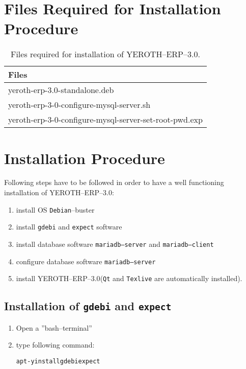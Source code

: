\documentclass[a4paper, 10pt]{article}
\newcommand{\texlive}{\texttt{Texlive}\xspace}
\newcommand{\gdebi}{\texttt{gdebi}\xspace}
\newcommand{\expect}{\texttt{expect}\xspace}
\newcommand{\debian}{\texttt{Debian}\xspace}
\newcommand{\qt}{\texttt{Qt}\xspace}
\newcommand{\mariadbserver}{\texttt{mariadb--server}\xspace}
\newcommand{\mariadbclient}{\texttt{mariadb--client}\xspace}
\newcommand{\yerotherptroiszero}{\textcolor{yerenColorBlue}{\sc YEROTH--ERP--$3.0$}\xspace}
\newcommand{\rootcommand}[1]{
\begin{center}
\textcolor{purplish}{#1\xspace}
\end{center}}
\begin{document}
\section{Files Required for Installation Procedure}

\begin{table}[!htbp]
\centering
\begin{tabular}{|l|} \hline
\textbf{Files}		\\ \hline
yeroth-erp-3.0-standalone.deb							\\ \hline
yeroth-erp-3-0-configure-mysql-server.sh				\\ \hline	
yeroth-erp-3-0-configure-mysql-server-set-root-pwd.exp	\\ \hline	
\end{tabular}
\caption{Files required for installation of \yerotherptroiszero.}
\label{tab:prerequisite-software}
\end{table}

\section{Installation Procedure}

Following steps have to be followed in order to have
a well functioning installation of \yerotherptroiszero:

\begin{enumerate} [1)]
	\item install OS \debian--buster
	\item install \gdebi and \expect software
	\item install database software \mariadbserver and \mariadbclient
	\item configure database software \mariadbserver
	\item install \yerotherptroiszero (\qt and \texlive are automatically installed).
\end{enumerate}

\subsection{Installation of \gdebi and \expect}

\begin{enumerate}[1)]
	\item Open a ''bash--terminal''
	\item type following command:
		\begin{alltt}
			\rootcommand{apt -y install gdebi expect}
		\end{alltt}
\end{enumerate} 
\end{document}
